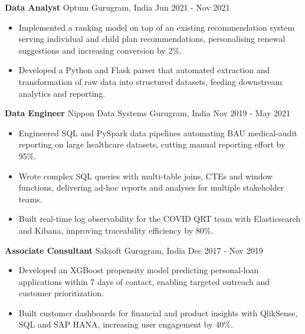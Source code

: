 \documentclass[10pt,a4paper]{article}
\newcommand{\role}[4]{\textbf{#1} \textbar{} #2 \hfill #3 \textbar{} #4\par}
\begin{document}
\vspace{3pt}
\role{Data Analyst}{Optum}{Gurugram, India}{Jun 2021 - Nov 2021}
\begin{itemize}
  \item Implemented a ranking model on top of an existing recommendation system serving individual and child plan recommendations, personalising renewal suggestions and increasing conversion by 2\%.
  \item Developed a Python and Flask parser that automated extraction and transformation of raw data into structured datasets, feeding downstream analytics and reporting.
\end{itemize}
\vspace{3pt}
\role{Data Engineer}{Nippon Data Systems}{Gurugram, India}{Nov 2019 - May 2021}
\begin{itemize}
  \item Engineered SQL and PySpark data pipelines automating BAU medical-audit reporting on large healthcare datasets, cutting manual reporting effort by 95\%.
  \item Wrote complex SQL queries with multi-table joins, CTEs and window functions, delivering ad-hoc reports and analyses for multiple stakeholder teams.
  \item Built real-time log observability for the COVID QRT team with Elasticsearch and Kibana, improving traceability efficiency by 80\%.
\end{itemize}
\vspace{3pt}
\role{Associate Consultant}{Saksoft}{Gurugram, India}{Dec 2017 - Nov 2019}
\begin{itemize}
  \item Developed an XGBoost propensity model predicting personal-loan applications within 7 days of contact, enabling targeted outreach and customer prioritization.
  \item Built customer dashboards for financial and product insights with QlikSense, SQL and SAP HANA, increasing user engagement by 40\%.
\end{itemize}
\end{document}
